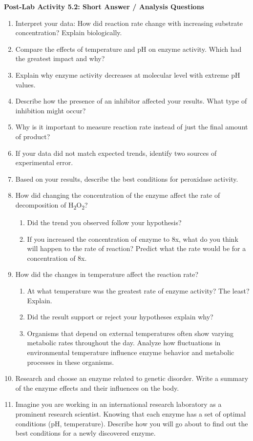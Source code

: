 \documentclass[
  letterpaper,
  DIV=11,
  numbers=noendperiod]{scrreprt}
\begin{document}
\textbf{Post-Lab Activity 5.2: Short Answer / Analysis Questions}

\begin{enumerate}
\def\labelenumi{\arabic{enumi}.}
\item
  Interpret your data: How did reaction rate change with increasing
  substrate concentration? Explain biologically.
\item
  Compare the effects of temperature and pH on enzyme activity. Which
  had the greatest impact and why?
\item
  Explain why enzyme activity decreases at molecular level with extreme
  pH values.
\item
  Describe how the presence of an inhibitor affected your results. What
  type of inhibition might occur?
\item
  Why is it important to measure reaction rate instead of just the final
  amount of product?
\item
  If your data did not match expected trends, identify two sources of
  experimental error.
\item
  Based on your results, describe the best conditions for peroxidase
  activity.
\item
  How did changing the concentration of the enzyme affect the rate of
  decomposition of H\textsubscript{2}O\textsubscript{2}?

  \begin{enumerate}
  \def\labelenumii{\arabic{enumii}.}
  \item
    Did the trend you observed follow your hypothesis?
  \item
    If you increased the concentration of enzyme to 8x, what do you
    think will happen to the rate of reaction? Predict what the rate
    would be for a concentration of 8x.
  \end{enumerate}
\item
  How did the changes in temperature affect the reaction rate?

  \begin{enumerate}
  \def\labelenumii{\alph{enumii}.}
  \item
    At what temperature was the greatest rate of enzyme activity? The
    least? Explain.
  \item
    Did the result support or reject your hypotheses explain why?
  \item
    Organisms that depend on external temperatures often show varying
    metabolic rates throughout the day. Analyze how fluctuations in
    environmental temperature influence enzyme behavior and metabolic
    processes in these organisms.
  \end{enumerate}
\item
  Research and choose an enzyme related to genetic disorder. Write a
  summary of the enzyme effects and their influences on the body.
\item
  Imagine you are working in an international research laboratory as a
  prominent research scientist. Knowing that each enzyme has a set of
  optimal conditions (pH, temperature). Describe how you will go about
  to find out the best conditions for a newly discovered enzyme.
\end{enumerate}
\end{document}
